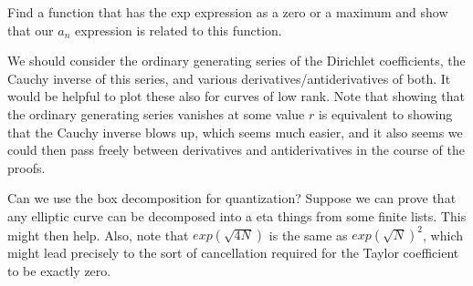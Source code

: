 \documentclass[paper=a4, fontsize=11pt]{scrartcl} %
\numberwithin{equation}{section} %
\numberwithin{figure}{section} %
\numberwithin{table}{section} %
\begin{document}
Find a function that has the exp expression as a zero or a maximum and show that our $a_n$ expression is related to this function.

We should consider the ordinary generating series of the Dirichlet coefficients, the Cauchy inverse of this series, and various derivatives/antiderivatives of both. It would be helpful to plot these also for curves of low rank. Note that showing that the ordinary generating series vanishes at some value $r$ is equivalent to showing that the Cauchy inverse blows up, which seems much easier, and it also seems we could then pass freely between derivatives and antiderivatives in the course of the proofs.

Can we use the box decomposition for quantization? Suppose we can prove that any elliptic curve can be decomposed into a eta things from some finite lists. This might then help. Also, note that $exp(\sqrt{4N})$ is the same as $exp(\sqrt{N})^2$, which might lead precisely to the sort of cancellation required for the Taylor coefficient to be exactly zero.




\end{document}
